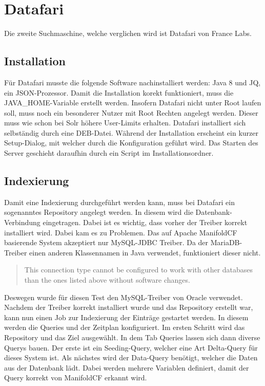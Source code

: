 
\section{Datafari}

Die zweite Suchmaschine, welche verglichen wird ist Datafari von France Labs.

\subsection{Installation}

Für Datafari musste die folgende Software nachinstalliert werden: Java 8 und JQ, ein JSON-Prozessor. Damit die Installation korekt funktioniert, muss die JAVA\_HOME-Variable erstellt werden. Insofern Datafari nicht unter Root laufen soll, muss noch ein besonderer Nutzer mit Root Rechten angelegt werden. Dieser muss wie schon bei Solr höhere User-Limits erhalten. Datafari installiert sich selbständig durch eine DEB-Datei. Während der Installation erscheint ein kurzer Setup-Dialog, mit welcher durch die Konfiguration geführt wird. Das Starten des Server geschieht daraufhin durch ein Script im Installationsordner.

\subsection{Indexierung}

Damit eine Indexierung durchgeführt werden kann, muss bei Datafari ein sogenanntes Repository angelegt werden. In diesem wird die Datenbank-Verbindung eingetragen. Dabei ist es wichtig, dass vorher der Treiber korrekt installiert wird. Dabei kam es zu Problemen.
Das auf Apache ManifoldCF basierende System akzeptiert nur MySQL-JDBC Treiber. Da der MariaDB-Treiber einen anderen Klassennamen in Java verwendet, funktioniert dieser nicht. \begin{quote} This connection type cannot be configured to work with other databases than the ones listed above without software changes.~\cite[S.~61]{ApacheSoftwareFoundation.}\end{quote} Deswegen wurde für diesen Test den MySQL-Treiber von Oracle verwendet.
Nachdem der Treiber korrekt installiert wurde und das Repository erstellt war, kann nun einen Job zur Indexierung der Einträge gestartet werden. In diesem werden die Queries und der Zeitplan konfiguriert.
Im ersten Schritt wird das Repository und das Ziel ausgewählt. In dem Tab Queries lassen sich dann diverse Querys bauen. Der erste ist ein Seeding-Query, welcher eine Art Delta-Query für dieses System ist. Als nächstes wird der Data-Query benötigt, welcher die Daten aus der Datenbank lädt. Dabei werden mehrere Variablen definiert, damit der Query korrekt von ManifoldCF erkannt wird. 

